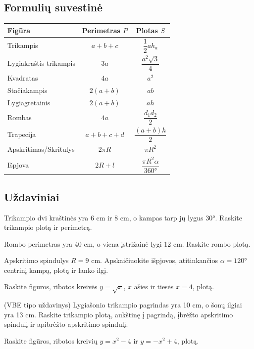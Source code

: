 \subsection{Formulių suvestinė}

\begin{center}
\renewcommand{\arraystretch}{1.6}
\begin{tabular}{|l|c|c|}
\hline
\textbf{Figūra} & \textbf{Perimetras} $P$ & \textbf{Plotas} $S$ \\
\hline
Trikampis & $a+b+c$ & $\dfrac{1}{2}ah_a$ \\
\hline
Lygiakraštis trikampis & $3a$ & $\dfrac{a^2\sqrt{3}}{4}$ \\
\hline
Kvadratas & $4a$ & $a^2$ \\
\hline
Stačiakampis & $2(a+b)$ & $ab$ \\
\hline
Lygiagretainis & $2(a+b)$ & $ah$ \\
\hline
Rombas & $4a$ & $\dfrac{d_1 d_2}{2}$ \\
\hline
Trapecija & $a+b+c+d$ & $\dfrac{(a+b)h}{2}$ \\
\hline
Apskritimas/Skritulys & $2\pi R$ & $\pi R^2$ \\
\hline
Išpjova & $2R + l$ & $\dfrac{\pi R^2 \alpha}{360°}$ \\
\hline
\end{tabular}
\end{center}

\subsection{Uždaviniai}

\begin{exercise}
Trikampio dvi kraštinės yra 6 cm ir 8 cm, o kampas tarp jų lygus $30°$. Raskite trikampio plotą ir perimetrą.
\end{exercise}

\begin{exercise}
Rombo perimetras yra 40 cm, o viena įstrižainė lygi 12 cm. Raskite rombo plotą.
\end{exercise}

\begin{exercise}
Apskritimo spindulys $R = 9$ cm. Apskaičiuokite išpjovos, atitinkančios $\alpha = 120°$ centrinį kampą, plotą ir lanko ilgį.
\end{exercise}

\begin{exercise}
Raskite figūros, ribotos kreivės $y = \sqrt{x}$, $x$ ašies ir tiesės $x = 4$, plotą.
\end{exercise}

\begin{exercise}
(VBE tipo uždavinys) Lygiašonio trikampio pagrindas yra 10 cm, o šonų ilgiai yra 13 cm. Raskite trikampio plotą, aukštinę į pagrindą, įbrėžto apskritimo spindulį ir apibrėžto apskritimo spindulį.
\end{exercise}

\begin{exercise}
Raskite figūros, ribotos kreivių $y = x^2 - 4$ ir $y = -x^2 + 4$, plotą.
\end{exercise}

